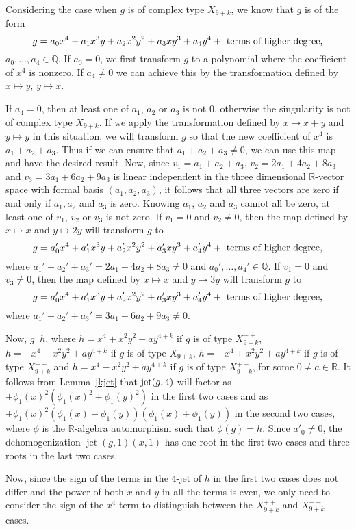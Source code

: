 \documentclass{amsproc}
\DeclareMathOperator{\requiv}{\overset{r}{\sim}}
\DeclareMathOperator{\jt}{jet}
\begin{document}
Considering the case when $g$ is of complex type $X_{9+k}$, we know that $g$ is of the
form \[g=a_0x^4+a_1x^3y+a_2x^2y^2+a_3xy^3+a_4y^4+\textnormal{ terms of higher degree,}\]
$a_0,\ldots,a_4\in\mathbb Q$.
If $a_0= 0$, we first transform $g$ to a polynomial where the coefficient of $x^4$ is nonzero. If $a_4\neq
0$ we can achieve this by the transformation defined by $x\mapsto y$, $y\mapsto x$.

If $a_4=0$, then at least one of $a_1$, $a_2$ or $a_3$ is not $0$, otherwise the
singularity  is not of complex type $X_{9+k}$.  If we apply the transformation defined by $x\mapsto x+y$ and
$y\mapsto y$ in this situation, we will transform $g$ so that the new
coefficient of $x^4$ is $a_1+a_2+a_3$. Thus if we can ensure that $a_1+a_2+a_3\neq 0$, we
can use this map and have the desired result. Now, since $v_1=a_1+a_2+a_3$,
$v_2=2a_1+4a_2+8a_3$ and $v_3=3a_1+6a_2+9a_3$ is linear independent in the
three dimensional
$\mathbb R$-vector space with formal basis $(a_1, a_2, a_3)$, it follows that all
three vectors are zero if and only if $a_1,a_2$ and $a_3$ is zero. Knowing $a_1$, $a_2$
and $a_3$ cannot all be zero, at least one of $v_1$, $v_2$ or $v_3$ is not
zero. If $v_1=0$ and $v_2\neq 0$, then the map defined by $x\mapsto x$ and $y\mapsto 2y$
will transform $g$ to \[g=a_0'x^4+a_1'x^3y+a_2'x^2y^2+a_3'xy^3+a_4'y^4+\textnormal{
terms of higher degree,}\] where $a_1'+a_2'+a_3'=2a_1+4a_2+8a_3\neq 0$ and $a_0',\ldots,a_4'\in\mathbb Q$. If $v_1=0$ and
$v_3\neq 0$, then the map defined by $x\mapsto x$ and $y\mapsto 3y$ will transform $g$
to  \[g=a_0'x^4+a_1'x^3y+a_2'x^2y^2+a_3'xy^3+a_4'y^4+\textnormal{ terms of higher
degree,}\]where $a_1'+a_2'+a_3'=3a_1+6a_2+9a_3\neq0$. 

Now, $g\requiv h$, where $h=x^4+x^2y^2+ay^{4+k}$ if $g$ is of type
$X_{9+k}^{++}$, $h=-x^4-x^2y^2+ay^{4+k}$ if $g$ is of type $X_{9+k}^{--}$,
$h=-x^4+x^2y^2+ay^{4+k}$ if $g$ is of type $X_{9+k}^{-+}$ and
$h=x^4-x^2y^2+ay^{4+k}$ if $g$ is of type $X_{9+k}^{+-}$, for some $0\neq a\in\mathbb R$.  It follows
from Lemma~\ref{kjet} that $\textnormal{jet}(g,4)$ will factor as
$\pm\phi_1(x)^2(\phi_1(x)^2+\phi_1(y)^2)$ in the first two cases and as
$\pm\phi_1(x)^2(\phi_1(x)-\phi_1(y))(\phi_1(x)+\phi_1(y))$ in the second two
cases, where $\phi$ is the $\mathbb R$-algebra automorphism such that
$\phi(g)=h$. Since $a'_0\neq 0$,  the dehomogenization $\jt(g,1)(x,1)$ has one root in the first two
cases and
three roots in the last two cases.

Now, since the sign of the terms in the $4$-jet of $h$ in the first two cases
does not differ and the power of both $x$ and $y$ in all the terms is even,
we only need to consider the sign of the $x^4$-term to distinguish between
the $X_{9+k}^{++}$ and $X_{9+k}^{--}$ cases.
\end{document}
